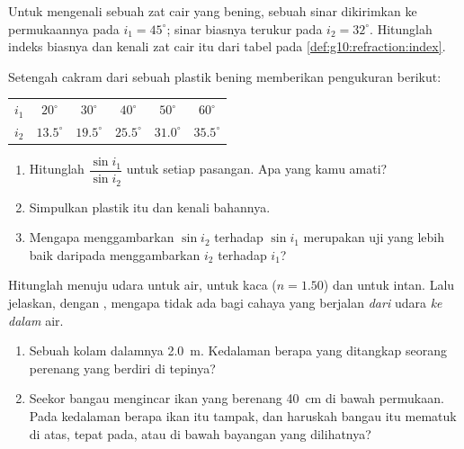 \begin{exercise}[$\star$]\label{exo:g10:refraction:5}
Untuk mengenali sebuah zat cair yang bening, sebuah sinar dikirimkan ke
permukaannya pada $i_1 = 45^\circ$; sinar biasnya terukur pada
$i_2 = 32^\circ$. Hitunglah indeks biasnya dan kenali zat cair itu dari
tabel pada \cref{def:g10:refraction:index}.
\end{exercise}

\begin{exercise}[$\star\star$]\label{exo:g10:refraction:6}
Setengah cakram dari sebuah plastik bening memberikan pengukuran berikut:
\begin{center}
\begin{tabular}{lccccc}
$i_1$ & $20^\circ$ & $30^\circ$ & $40^\circ$ & $50^\circ$ & $60^\circ$ \\
$i_2$ & $13.5^\circ$ & $19.5^\circ$ & $25.5^\circ$ & $31.0^\circ$
      & $35.5^\circ$ \\
\end{tabular}
\end{center}
\begin{enumerate}
  \item Hitunglah $\dfrac{\sin i_1}{\sin i_2}$ untuk setiap pasangan.
        Apa yang kamu amati?
  \item Simpulkan  plastik itu dan kenali bahannya.
  \item Mengapa menggambarkan $\sin i_2$ terhadap $\sin i_1$ merupakan
        uji  yang lebih baik daripada menggambarkan $i_2$
        terhadap $i_1$?
\end{enumerate}
\end{exercise}

\begin{exercise}[$\star\star$]\label{exo:g10:refraction:7}
Hitunglah  menuju udara untuk air, untuk kaca ($n = 1.50$)
dan untuk intan. Lalu jelaskan, dengan , mengapa tidak ada
 bagi cahaya yang berjalan \emph{dari} udara \emph{ke
dalam} air.
\end{exercise}

\begin{exercise}[$\star\star$]\label{exo:g10:refraction:8}
\begin{enumerate}
  \item Sebuah kolam dalamnya \qty{2.0}{m}. Kedalaman berapa yang
        ditangkap seorang perenang yang berdiri di tepinya?
  \item Seekor bangau mengincar ikan yang berenang \qty{40}{cm} di
        bawah permukaan. Pada kedalaman berapa ikan itu tampak, dan
        haruskah bangau itu mematuk di atas, tepat pada, atau di bawah
        bayangan yang dilihatnya?
\end{enumerate}
\end{exercise}

